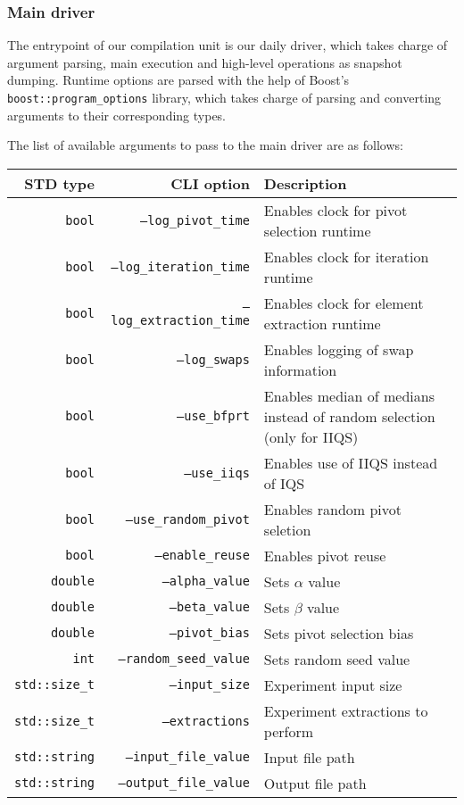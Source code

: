 \subsubsection{Main driver}
The entrypoint of our compilation unit is our daily driver, which takes charge of argument parsing, main execution and high-level operations as snapshot dumping.  Runtime options are parsed with the help of Boost's \texttt{boost::program\_options} library, which takes charge of parsing and converting arguments to their corresponding types. 

The list of available arguments to pass to the main driver are as follows:

\begin{tabularx}{\linewidth}{|r|r|X|}
    \hline
    STD type & CLI option & Description \\
    \hline
    \texttt{bool} & \texttt{--log\_pivot\_time} & Enables clock for pivot selection runtime\\
    \hline
    \texttt{bool} & \texttt{--log\_iteration\_time} & Enables clock for iteration runtime \\
    \hline
    \texttt{bool} & \texttt{--log\_extraction\_time} & Enables clock for element extraction runtime\\
    \hline
    \texttt{bool} & \texttt{--log\_swaps} & Enables logging of swap information \\
    \hline
    \texttt{bool} & \texttt{--use\_bfprt} & Enables median of medians instead of random selection (only for IIQS) \\
    \hline
    \texttt{bool} & \texttt{--use\_iiqs} & Enables use of IIQS instead of IQS \\
    \hline
    \texttt{bool} & \texttt{--use\_random\_pivot} & Enables random pivot seletion \\
    \hline
    \texttt{bool} & \texttt{--enable\_reuse} & Enables pivot reuse \\
    \hline
    \texttt{double} & \texttt{--alpha\_value} & Sets $\alpha$ value \\
    \hline
    \texttt{double} & \texttt{--beta\_value} & Sets $\beta$ value \\
    \hline
    \texttt{double} & \texttt{--pivot\_bias} & Sets pivot selection bias \\
    \hline
    \texttt{int} & \texttt{--random\_seed\_value} & Sets random seed value \\
    \hline
    \texttt{std::size\_t} & \texttt{--input\_size} & Experiment input size \\
    \hline
    \texttt{std::size\_t} & \texttt{--extractions} & Experiment extractions to perform \\
    \hline
    \texttt{std::string} & \texttt{--input\_file\_value} & Input file path \\
    \hline
    \texttt{std::string} & \texttt{--output\_file\_value} & Output file path \\
    \hline    
\end{tabularx}

